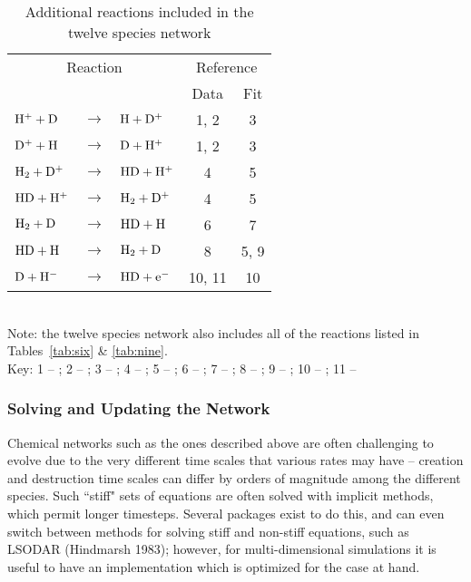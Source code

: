 \begin{table}
\caption{Additional reactions included in the twelve species network \label{tab:12}}
\begin{tabular}{lclcc}
\hline
\multicolumn{3}{c}{Reaction} & \multicolumn{2}{c}{Reference} \\
& & & Data & Fit \\
\hline
${\rm H^{+} + D}$ & $\rightarrow$ & ${\rm H + D^{+}}$ & 1, 2 & 3 \\
${\rm D^{+} + H}$ & $\rightarrow$ & ${\rm D + H^{+}}$ & 1, 2 & 3 \\
${\rm H_{2} + D^{+}}$ & $\rightarrow$ & ${\rm HD + H^{+}}$ & 4 & 5 \\
${\rm HD + H^{+}}$ & $\rightarrow$ & ${\rm H_{2} + D^{+}}$ & 4 & 5 \\
${\rm H_{2} + D}$ & $\rightarrow$ & ${\rm HD + H}$ & 6 & 7 \\
${\rm HD + H}$ & $\rightarrow$ & ${\rm H_{2} + D}$ & 8 & 5, 9 \\
${\rm D + H^{-}}$ & $\rightarrow$ & ${\rm HD + e^{-}}$ & 10, 11 & 10  \\
\hline
\end{tabular}
\\ Note: the twelve species network also includes all of the reactions listed in Tables~\ref{tab:six} \& \ref{tab:nine}.
\\ Key: 1 -- \citet{1999PhRvL..83.4041I}; 2 -- \citet{2000PhRvA..62d2706Z}; 3 -- \citet{2002ApJ...566..599S};
4 -- \citet{1982sasp.nasa..304G}; 5 -- \citet{2002P&SS...50.1197G}; 6 -- \citet{2003PhRvL..91f3201M}; 7 -- \citet{2011ApJ...727..110C}; 
8 -- \citet{1959JChPh..31.1359S}; 9 -- \citet{2007MNRAS.376..709R}; 10 -- \citet{2010Sci...329...69K}; 11 -- \citet{2012PhRvA..86c2714M}
\end{table}


\subsubsection{Solving and Updating the Network}

Chemical networks such as the ones described above are often challenging to evolve due to the very different time scales that various rates may have -- creation and destruction time scales can differ by orders of magnitude among the different species.   Such ``stiff" sets of equations are often solved with implicit methods, which permit longer timesteps.  Several packages exist to do this, and can even switch between methods for solving stiff and non-stiff equations, such as LSODAR (Hindmarsh 1983); however, for multi-dimensional simulations it is useful to have an implementation which is optimized for the case at hand.

